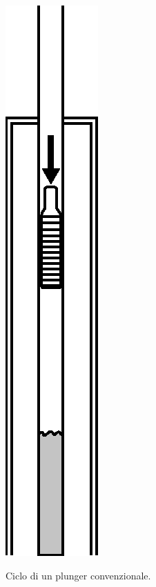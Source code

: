 \begin{figure}[htbp]
    {\centering \includegraphics[height=.3\textheight]{fig/foamer/plunger-conventional/conventionalplunger-E.eps} \label{fig:plunger-conventional-E} }
    \caption{Ciclo di un plunger convenzionale.}
    \label{fig:conventionalplunger}
\end{figure}

